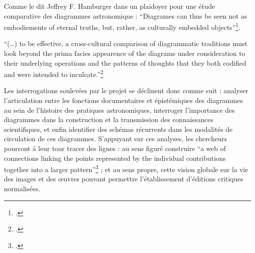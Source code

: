 Comme le dit Jeffrey F. Hamburger dans un plaidoyer pour une étude
comparative des diagrammes astronomique : ``Diagrames can thus be seen
not as embodiements of eternal truths, but, rather, as culturally
embedded objects''\footcite[p.7]{safran_diagram_2022}.

\begin{kwote}
``(\ldots) to be effective, a cross-cultural comparison of diagrammatic
traditions must look beyond the prima facies appearence of the diagrams
under consideration to their underlying operations and the patterns of
thoughts that they both codified and were intended to
inculcate.''\footcite[p.3]{safran_diagram_2022}
\end{kwote}         

Les interrogations soulevées par le projet \eida se déclinent donc comme
suit : analyser l'articulation entre les fonctions documentaires et
épistémiques des diagrammes au sein de l'histoire des pratiques
astronomiques, interroger l'importance des diagrammes dans la
construction et la transmission des connaissances scientifiques, et
enfin identifier des schémas récurrents dans les modalités de
circulation de ces diagrammes. S'appuyant sur ces analyses, les
chercheurs pourront à leur tour tracer des lignes : au sens figuré
construire ``a web of connections linking the points represented by the
individual contributions together into a larger pattern''\footcite[p.10]{safran_diagram_2022} ; et
au sens propre, cette vision globale sur la vie des images et des œuvres
pouvant permettre l'établissement d'éditions critiques normalisées.